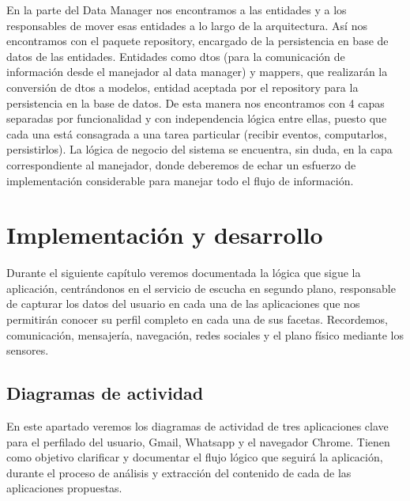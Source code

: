 \documentclass[12pt,a4paper,oneside]{book} %
\begin{document}
\newline \newline
En la parte del Data Manager nos encontramos a las entidades y a los responsables de mover esas entidades a lo largo de la arquitectura. 
\newline \newline
Así nos encontramos con el paquete repository, encargado de la persistencia en base de datos de las entidades. Entidades como dtos (para la comunicación de información desde el manejador al data manager) y mappers, que realizarán la conversión de dtos a modelos, entidad aceptada por el repository para la persistencia en la base de datos. 
\newline \newline
De esta manera nos encontramos con 4 capas separadas por funcionalidad y con independencia lógica entre ellas, puesto que cada una está consagrada a una tarea particular (recibir eventos, computarlos, persistirlos). 
\newline \newline
La lógica de negocio del sistema se encuentra, sin duda, en la capa correspondiente al manejador, donde deberemos de echar un esfuerzo de implementación considerable para manejar todo el flujo de información. 


\chapter{Implementación y desarrollo}
Durante el siguiente capítulo veremos documentada la lógica que sigue la aplicación, centrándonos en el servicio de escucha en segundo plano, responsable de capturar los datos del usuario en cada una de las aplicaciones que nos permitirán conocer su perfil completo en cada una de sus facetas. Recordemos, comunicación, mensajería, navegación, redes sociales y el plano físico mediante los sensores. 
\newpage
\section{Diagramas de actividad}
En este apartado veremos los diagramas de actividad de tres aplicaciones clave para el perfilado del usuario, Gmail, Whatsapp y el navegador Chrome. Tienen como objetivo clarificar y documentar el flujo lógico que seguirá la aplicación, durante el proceso de análisis y extracción del contenido de cada de las aplicaciones propuestas. 
\end{document}
